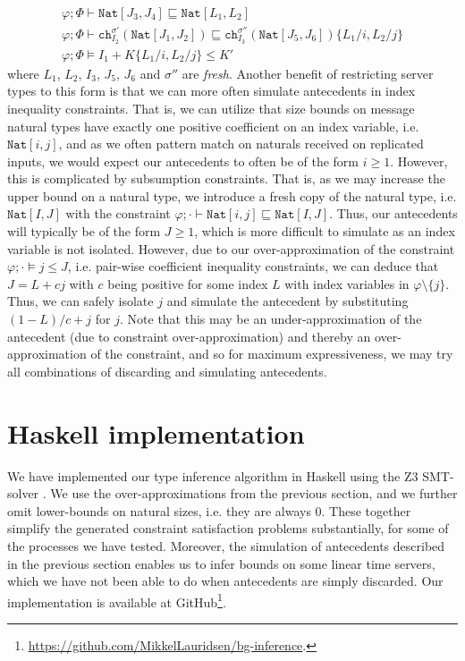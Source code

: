 \begin{align*}
    \varphi;\Phi\vdash \texttt{Nat}[J_3,J_4] \sqsubseteq \texttt{Nat}[L_1,L_2]\\
    \varphi;\Phi\vdash \texttt{ch}^{\sigma'}_{I_2}(\texttt{Nat}[J_1,J_2]) \sqsubseteq \texttt{ch}^{\sigma''}_{I_3}(\texttt{Nat}[J_5,J_6])\{L_1/i, L_2/j\}\\
    \varphi;\Phi\vDash I_1 + K\{L_1/i,L_2/j\} \leq K'
\end{align*}
where $L_1$, $L_2$, $I_3$, $J_5$, $J_6$ and $\sigma''$ are \textit{fresh}. Another benefit of restricting server types to this form is that we can more often simulate antecedents in index inequality constraints. That is, we can utilize that size bounds on message natural types have exactly one positive coefficient on an index variable, i.e. $\texttt{Nat}[i,j]$, and as we often pattern match on naturals received on replicated inputs, we would expect our antecedents to often be of the form $i\geq 1$. However, this is complicated by subsumption constraints. That is, as we may increase the upper bound on a natural type, we introduce a fresh copy of the natural type, i.e. $\texttt{Nat}[I,J]$ with the constraint  $\varphi;\cdot\vdash \texttt{Nat}[i,j] \sqsubseteq \texttt{Nat}[I,J]$. Thus, our antecedents will typically be of the form $J \geq 1$, which is more difficult to simulate as an index variable is not isolated. However, due to our over-approximation of the constraint $\varphi;\cdot\vDash j \leq J$, i.e. pair-wise coefficient inequality constraints, we can deduce that $J = L + cj$ with $c$ being positive for some index $L$ with index variables in $\varphi\setminus\{j\}$. Thus, we can safely isolate $j$ and simulate the antecedent by substituting $(1-L)/c + j$ for $j$. Note that this may be an under-approximation of the antecedent (due to constraint over-approximation) and thereby an over-approximation of the constraint, and so for maximum expressiveness, we may try all combinations of discarding and simulating antecedents.
%
\section{Haskell implementation}

We have implemented our type inference algorithm in Haskell using the Z3 SMT-solver \cite{Z3}. We use the over-approximations from the previous section, and we further omit lower-bounds on natural sizes, i.e. they are always 0. These together simplify the generated constraint satisfaction problems substantially, for some of the processes we have tested. Moreover, the simulation of antecedents described in the previous section enables us to infer bounds on some linear time servers, which we have not been able to do when antecedents are simply discarded. Our implementation is available at GitHub\footnote{\url{https://github.com/MikkelLauridsen/bg-inference}.}. \\

